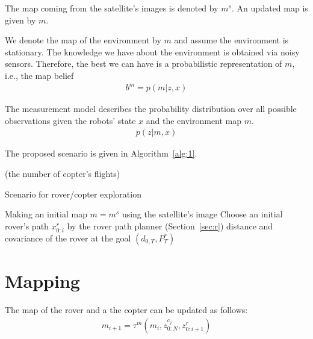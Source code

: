 \documentclass[conference]{IEEEtran}
\begin{document}
The map coming from the satellite's images is denoted by $m^s$. An updated map is given by $m$. 

We denote the map of the environment by $m$ and assume the environment is stationary. The knowledge we have about the environment is obtained via noisy sensors. Therefore, the best we can have is a probabilistic representation of $m$, i.e., the map belief
\begin{align}
    b^m=p(m|z, x)
\end{align}

The measurement model describes the probability distribution over all possible observations given the robots' state $x$ and the environment map $m$.
\begin{align}
    p(z|m, x)
\end{align}

The proposed scenario is given in Algorithm~\ref{alg:1}.


(the number of copter's flights)


\begin{algorithm}[!ht]
\caption{Scenario for rover/copter exploration}
\label{alg:1}
\DontPrintSemicolon
Making an initial map $m=m^s$ using the satellite's image\;
Choose an initial rover's path $x^r_{0:i}$ by the rover path planner (Section~\ref{sec:r})\;
\Return distance and covariance of the rover at the goal $(d_{0,T}, P^r_T)$
\end{algorithm}


\section{Mapping}


The map of the rover and a the copter can be updated as follows:
\begin{align}
m_{i+1} = \tau^m (m_{i}, z^{c_j}_{0:N}, z^r_{0:i+1})
\end{align}
\end{document}
